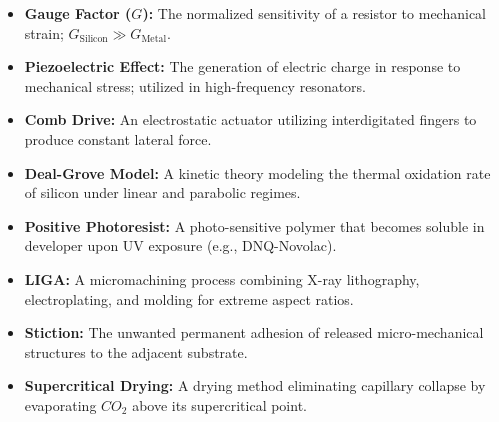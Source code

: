 \documentclass[12pt,a4paper]{article}
\begin{document}
\begin{tcolorbox}[defbox, title={\textbf{One-Line Definitions}}]
\begin{itemize}[leftmargin=*, itemsep=2.5pt, topsep=0pt]
  \item \textbf{Gauge Factor ($G$):} The normalized sensitivity of a resistor to mechanical strain; $G_{\text{Silicon}} \gg G_{\text{Metal}}$.
  \item \textbf{Piezoelectric Effect:} The generation of electric charge in response to mechanical stress; utilized in high-frequency resonators.
  \item \textbf{Comb Drive:} An electrostatic actuator utilizing interdigitated fingers to produce constant lateral force.
  \item \textbf{Deal-Grove Model:} A kinetic theory modeling the thermal oxidation rate of silicon under linear and parabolic regimes.
  \item \textbf{Positive Photoresist:} A photo-sensitive polymer that becomes soluble in developer upon UV exposure (e.g., DNQ-Novolac).
  \item \textbf{LIGA:} A micromachining process combining X-ray lithography, electroplating, and molding for extreme aspect ratios.
  \item \textbf{Stiction:} The unwanted permanent adhesion of released micro-mechanical structures to the adjacent substrate.
  \item \textbf{Supercritical Drying:} A drying method eliminating capillary collapse by evaporating $CO_2$ above its supercritical point.
\end{itemize}
\end{tcolorbox}
\end{document}
